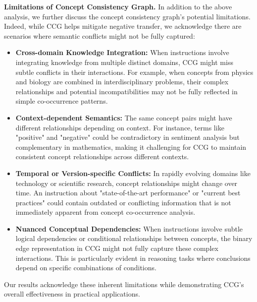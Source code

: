 \textbf{Limitations of Concept Consistency Graph.} In addition to the above analysis, we further discuss the concept consistency graph's potential limitations. Indeed, while CCG helps mitigate negative transfer, we acknowledge there are scenarios where semantic conflicts might not be fully captured:
\begin{itemize}[leftmargin=*]
  \item \textbf{Cross-domain Knowledge Integration:} When instructions involve integrating knowledge from multiple distinct domains, CCG might miss subtle conflicts in their interactions. For example, when concepts from physics and biology are combined in interdisciplinary problems, their complex relationships and potential incompatibilities may not be fully reflected in simple co-occurrence patterns.
  \item \textbf{Context-dependent Semantics:} The same concept pairs might have different relationships depending on context. For instance, terms like "positive" and "negative" could be contradictory in sentiment analysis but complementary in mathematics, making it challenging for CCG to maintain consistent concept relationships across different contexts.
  \item \textbf{Temporal or Version-specific Conflicts:} In rapidly evolving domains like technology or scientific research, concept relationships might change over time. An instruction about "state-of-the-art performance" or "current best practices" could contain outdated or conflicting information that is not immediately apparent from concept co-occurrence analysis.
  \item \textbf{Nuanced Conceptual Dependencies:} When instructions involve subtle logical dependencies or conditional relationships between concepts, the binary edge representation in CCG might not fully capture these complex interactions. This is particularly evident in reasoning tasks where conclusions depend on specific combinations of conditions.
\end{itemize}
Our results acknowledge these inherent limitations while demonstrating CCG's overall effectiveness in practical applications.


